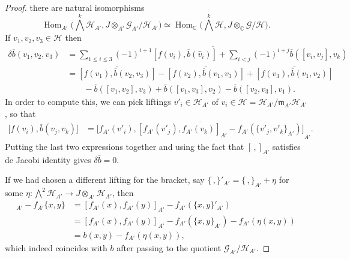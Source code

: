 \documentclass[reqno]{amsart}
\newcommand\C{\mathbb{C}}
\DeclareMathOperator{\Hom}{Hom}
\theoremstyle{definition}
\theoremstyle{named}
\begin{document}
\begin{proof}
there are natural isomorphisms 
$$\Hom_{A'}\bigg(\bigwedge^k \mathcal H_{A'}, J\otimes_{A'} \mathcal G_{A'}/\mathcal H_{A'}\bigg)\simeq \Hom_{\C}\bigg(\bigwedge^k\mathcal H,J\otimes_\C \mathcal G/\mathcal H\bigg). $$
If $v_1,v_2,v_3\in \mathcal H$ then
\begin{align*}
    \delta\overline{b}(v_1,v_2,v_3)&= \overline{\sum_{1\leq i\leq 3} (-1)^{i+1}[f(v_i),\overline{b}(\widehat{v}_i)]+\sum_{i<j} (-1)^{i+j}\overline{b}([v_i,v_j],v_k)}\\
    &=\overline{[f(v_1),\overline{b}(v_2,v_3)]}-\overline{[f(v_2),\overline{b}(v_1,v_3)]}+ \overline{[f(v_3),\overline{b}(v_1,v_2)]}\\ &\quad\quad- \overline{b}([v_1,v_2],v_3)+ \overline{b}([v_1,v_3],v_2) - \overline{b}([v_2,v_3],v_1).
\end{align*}
In order to compute this, we can pick liftings $v'_i\in \mathcal H_{A'}$ of $v_i\in \mathcal H=\mathcal H_{A'}/\mathfrak m_{A'}\mathcal H_{A'}$, so that
\begin{align*}
\big[f(v_i),\overline{b}(v_j,v_k)\big]&=\overline{\big[f_{A'}(v'_i),[f_{A'}(v'_j),f_{A'}(v_k)]_{A'}-f_{A'}(\{v'_j,v'_k\}_{A'})\big]}_{A'}.
\end{align*}
Putting the last two expressions together and using the fact that $[ \,,]_{A'}$ satisfies de Jacobi identity gives $\delta \overline{b}=0$.

If we had chosen a different lifting for the bracket, say $\{\,,\}'_{A'}=\{\,,\}_{A'}+\eta$ for some $\eta:\bigwedge^2\mathcal H_{A'}\to J\otimes_{A'}\mathcal H_{A'}$, then 
\begin{align*}
[f_{A'}(x),f_{A'}(y)]_{A'} - f_{A'}\{x,y\}
&=[f_{A'}(x),f_{A'}(y)]_{A'}-f_{A'}(\{x,y\}'_{A'}) \\
&=[f_{A'}(x),f_{A'}(y)]_{A'}-f_{A'}(\{x,y\}_{A'})-f_{A'}(\eta(x,y)) \\
&=b(x,y)-f_{A'}(\eta(x,y)),
\end{align*}
which indeed coincides with $b$ after passing to the quotient $\mathcal G_{A'}/\mathcal H_{A'}$.


\end{proof}
\end{document}
